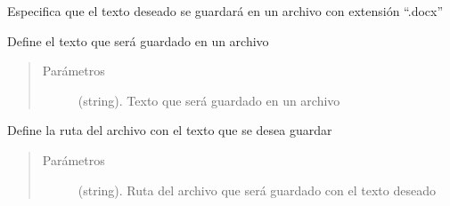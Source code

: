 \documentclass[letterpaper,10pt,openany,spanish]{sphinxmanual}
\begin{document}
\begin{fulllineitems}
\begin{fulllineitems}
\end{fulllineitems}


\begin{fulllineitems}
\label{\detokenize{funciones/escritura:escritura.Escritor.escribir_word}}
Especifica que el texto deseado se guardará en un archivo con extensión “.docx”

\end{fulllineitems}


\begin{fulllineitems}
\label{\detokenize{funciones/escritura:escritura.Escritor.establecer_texto}}
Define el texto que será guardado en un archivo
\begin{quote}\begin{description}
\item[{Parámetros}] \leavevmode
{} \textendash{} (string). Texto que será guardado en un archivo

\end{description}\end{quote}

\end{fulllineitems}


\begin{fulllineitems}
\label{\detokenize{funciones/escritura:escritura.Escritor.establecer_ubicacion}}
Define la ruta del archivo con el texto que se desea guardar
\begin{quote}\begin{description}
\item[{Parámetros}] \leavevmode
{} \textendash{} (string). Ruta del archivo que será guardado             con el texto deseado


\end{description}
\end{quote}
\end{fulllineitems}
\end{fulllineitems}
\end{document}
